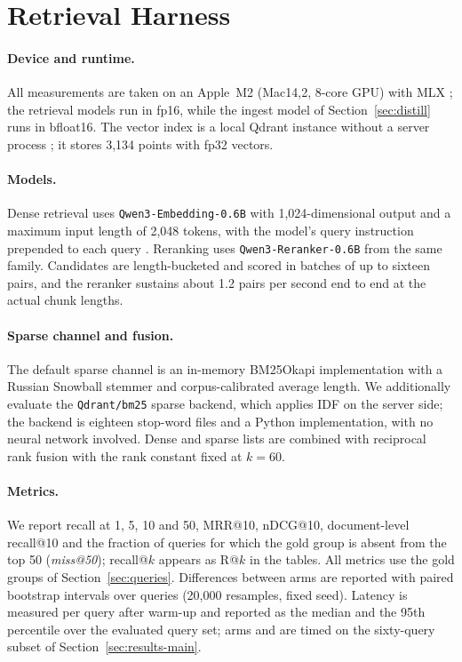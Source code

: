 \section{Retrieval Harness}
\label{sec:harness}

\paragraph{Device and runtime.}
All measurements are taken on an Apple~M2 (Mac14,2, 8-core GPU) with MLX
\citep{mlx}; the retrieval models run in fp16, while the ingest model of
Section~\ref{sec:distill} runs in bfloat16. The vector index is a local Qdrant
instance without a server process \citep{qdrant}; it stores 3{,}134 points with
fp32 vectors.

\paragraph{Models.}
Dense retrieval uses \texttt{Qwen3-Embedding-0.6B} with 1{,}024-dimensional
output and a maximum input length of 2{,}048 tokens, with the model's query
instruction prepended to each query \citep{qwen3embedding}. Reranking uses
\texttt{Qwen3-Reranker-0.6B} from the same family. Candidates are length-bucketed
and scored in batches of up to sixteen pairs, and the reranker sustains about
1.2 pairs per second end to end at the actual chunk lengths.

\paragraph{Sparse channel and fusion.}
The default sparse channel is an in-memory BM25Okapi implementation with a
Russian Snowball stemmer \citep{robertson2009bm25,porter1980algorithm} and
corpus-calibrated average length. We additionally evaluate the
\texttt{Qdrant/bm25} sparse backend, which applies IDF on the server side; the
backend is eighteen stop-word files and a Python implementation, with no neural
network involved. Dense and sparse lists are combined with reciprocal rank fusion
\citep{cormack2009reciprocal} with the rank constant fixed at $k=60$.

\paragraph{Metrics.}
We report recall at 1, 5, 10 and 50, MRR@10, nDCG@10, document-level recall@10
and the fraction of queries for which the gold group is absent from the top 50
(\emph{miss@50}); recall@$k$ appears as R@$k$ in the tables. All metrics use the
gold groups of Section~\ref{sec:queries}. Differences between arms are reported
with paired bootstrap intervals over queries (20{,}000 resamples, fixed seed).
Latency is measured per query after warm-up and reported as the median and the
95th percentile over the evaluated query set; arms  and  are timed
on the sixty-query subset of Section~\ref{sec:results-main}.


